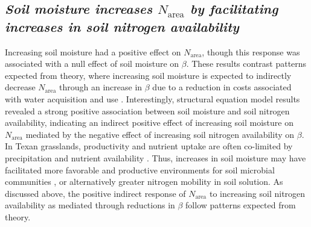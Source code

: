 \subsection{\textit{Soil moisture increases $N_\mathrm{area}$ by facilitating increases in soil nitrogen availability}}
\noindent Increasing soil moisture had a positive effect on $N_\mathrm{area}$, though this response was associated with a null effect of soil moisture on $\beta$. These results contrast patterns expected from theory, where increasing soil moisture is expected to indirectly decrease $N_\mathrm{area}$ through an increase in $\beta$ due to a reduction in costs associated with water acquisition and use . Interestingly, structural equation model results revealed a strong positive association between soil moisture and soil nitrogen availability, indicating an indirect positive effect of increasing soil moisture on $N_\mathrm{area}$ mediated by the negative effect of increasing soil nitrogen availability on $\beta$. In Texan grasslands, productivity and nutrient uptake are often co-limited by precipitation and nutrient availability . Thus, increases in soil moisture may have facilitated more favorable and productive environments for soil microbial communities , or alternatively greater nitrogen mobility in soil solution. As discussed above, the positive indirect response of $N_\mathrm{area}$ to increasing soil nitrogen availability as mediated through reductions in $\beta$ follow patterns expected from theory.

